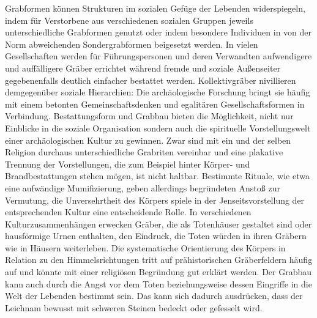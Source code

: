 \documentclass[openany,twoside,twocolumn]{book}
\begin{document}
Grabformen können Strukturen im sozialen Gefüge der Lebenden
widerspiegeln, indem für Verstorbene aus verschiedenen sozialen Gruppen
jeweils unterschiedliche Grabformen genutzt oder indem besondere
Individuen in von der Norm abweichenden Sondergrabformen beigesetzt
werden. In vielen Gesellschaften werden für Führungspersonen und deren
Verwandten aufwendigere und auffälligere Gräber errichtet während fremde
und soziale Außenseiter gegebenenfalls deutlich einfacher bestattet
werden. Kollektivgräber nivillieren demgegenüber soziale Hierarchien:
Die archäologische Forschung bringt sie häufig mit einem betonten
Gemeinschaftsdenken und egalitären Gesellschaftsformen in Verbindung.
Bestattungsform und Grabbau bieten die Möglichkeit, nicht nur Einblicke
in die soziale Organisation sondern auch die spirituelle
Vorstellungswelt einer archäologischen Kultur zu gewinnen. Zwar sind mit
ein und der selben Religion durchaus unterschiedliche Grabriten
vereinbar und eine plakative Trennung der Vorstellungen, die zum
Beispiel hinter Körper- und Brandbestattungen stehen mögen, ist nicht
haltbar. Bestimmte Rituale, wie etwa eine aufwändige Mumifizierung,
geben allerdings begründeten Anstoß zur Vermutung, die Unversehrtheit
des Körpers spiele in der Jenseitsvorstellung der entsprechenden Kultur
eine entscheidende Rolle. In verschiedenen Kulturzusammenhängen erwecken
Gräber, die als Totenhäuser gestaltet sind oder hausförmige Urnen
enthalten, den Eindruck, die Toten würden in ihren Gräbern wie in
Häusern weiterleben. Die systematische Orientierung des Körpers in
Relation zu den Himmelsrichtungen tritt auf prähistorischen
Gräberfeldern häufig auf und könnte mit einer religiösen Begründung gut
erklärt werden. Der Grabbau kann auch durch die Angst vor dem Toten
beziehungsweise dessen Eingriffe in die Welt der Lebenden bestimmt sein.
Das kann sich dadurch ausdrücken, dass der Leichnam bewusst mit schweren
Steinen bedeckt oder gefesselt wird.
\end{document}
